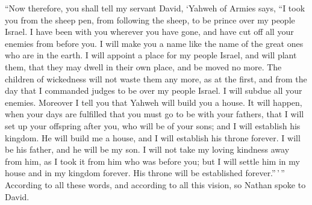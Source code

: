  ``Now therefore, you shall tell my servant David, `Yahweh
of Armies says, ``I took you from the sheep pen, from following the
sheep, to be prince over my people Israel.  I have been with
you wherever you have gone, and have cut off all your enemies from
before you. I will make you a name like the name of the great ones who
are in the earth.  I will appoint a place for my people
Israel, and will plant them, that they may dwell in their own place, and
be moved no more. The children of wickedness will not waste them any
more, as at the first,  and from the day that I commanded
judges to be over my people Israel. I will subdue all your enemies.
Moreover I tell you that Yahweh will build you a house.  It
will happen, when your days are fulfilled that you must go to be with
your fathers, that I will set up your offspring after you, who will be
of your sons; and I will establish his kingdom.  He will
build me a house, and I will establish his throne forever. 
I will be his father, and he will be my son. I will not take my loving
kindness away from him, as I took it from him who was before you;
 but I will settle him in my house and in my kingdom
forever. His throne will be established forever.''\,'\,'' 
According to all these words, and according to all this vision, so
Nathan spoke to David.

